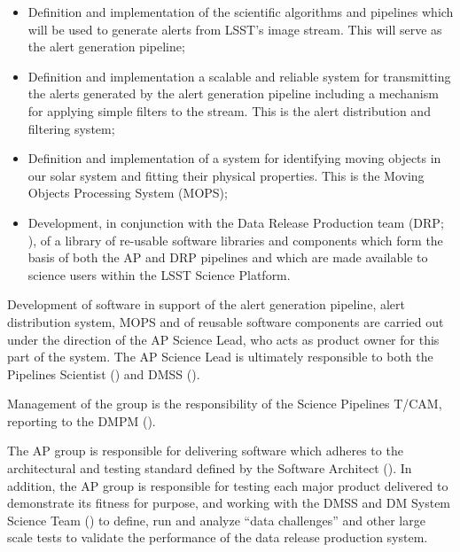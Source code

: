 \begin{itemize}

  \item{Definition and implementation of the scientific algorithms and pipelines which will be used to generate alerts from \gls{LSST}'s image stream.  This will serve as the alert generation \gls{pipeline};}

  \item{Definition and implementation a scalable and reliable system for transmitting the alerts generated by the alert generation \gls{pipeline} including a mechanism for applying simple filters to the stream. This is the alert distribution and filtering system;}

  \item{Definition and implementation of a system for identifying moving objects in our solar system and fitting their physical properties. This is the Moving Objects Processing System (\gls{MOPS});}

  \item{Development, in conjunction with the Data \gls{Release} Production team (\gls{DRP}; ), of a library of re-usable software libraries and components which form the basis of both the \gls{AP} and \gls{DRP} pipelines and which are made available to science users within the \gls{LSST} \gls{Science Platform}.}

\end{itemize}

Development of software in support of the alert generation \gls{pipeline}, alert distribution system, \gls{MOPS} and of reusable software components are carried out under the direction of the \gls{AP} Science Lead, who acts as product owner for this part of the system.
The \gls{AP} Science Lead is ultimately responsible to both the Pipelines Scientist () and \gls{DMSS} ().

Management of the group is the responsibility of the \gls{Science Pipelines} \gls{T/CAM}, reporting to the \gls{DMPM} ().

The \gls{AP} group is responsible for delivering software which adheres to the architectural and testing standard defined by the Software Architect ().
In addition, the \gls{AP} group is responsible for testing each major product delivered to demonstrate its fitness for purpose, and working with the \gls{DMSS} and \gls{DM} System Science Team () to define, run and analyze ``data challenges'' and other large scale tests to validate the performance of the data release production system.

